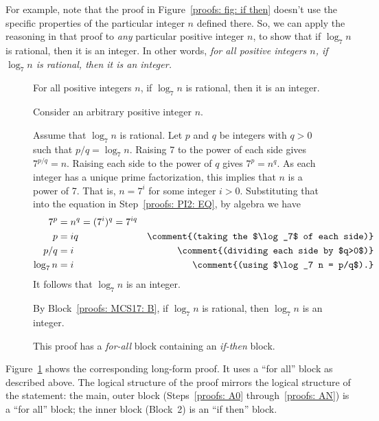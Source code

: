 For example, note that the proof in Figure~\ref{proofs: fig: if then} doesn't use the specific properties
of the particular integer $n$ defined there.
So, we can apply the reasoning in that proof to \emph{any} particular positive integer $n$,
to show that if $\log_7 n$ is rational, then it is an integer.
In other words,
\emph{for all positive integers $n$, if $\log_7 n$ is rational, then it is an integer.}
\begin{figure}
\begin{framed}
  \begin{theorem}
    For all positive integers $n$, if $\log_7 n$ is rational, then it is an integer.
  \end{theorem}
  \begin{longFormProof}
    \step[proofs: A0] Consider an arbitrary positive integer $n$.
    \begin{block}\label{proofs: MCS17: B}
      \step Assume that $\log_7 n$ is rational.
      \step Let $p$ and $q$ be integers with $q>0$ such that $p/q = \log_7 n$.
      \step Raising 7 to the power of each side gives $7^{p/q} {} = n$.  
      \step Raising each side to the power of $q$ gives $7^p {} = n^q$.\label{proofs: PI2: EQ}
      \step As each integer has a unique prime factorization, this implies that $n$ is a power of 7.
      \comment{\smash{$\vdots$}~~~}
      \step That is, $n=7^i$ for some integer $i > 0$.
      \step Substituting that into the equation in Step~\ref{proofs: PI2: EQ}, by algebra we have
      \begin{align*}
        7^p & = n^q = (7^i)^q = 7^{iq} \\
        p & = iq & \comment{(taking the $\log_7$ of each side)} \\
        p/q & = i & \comment{(dividing each side by $q>0$)} \\
        \log_7 n & = i & \comment{(using $\log_7 n = p/q$).}
      \end{align*}
      \step It follows that $\log_7 n$ is an integer.
    \end{block}
    \step[proofs: AN] By Block~\ref{proofs: MCS17: B}, if $\log_7 n$ is rational, then $\log_7 n$ is an integer.
  \end{longFormProof}
  \vspace*{-10pt}
\end{framed}
\vspace*{-10pt}
\caption{This proof has a \emph{for-all} block containing an \emph{if-then} block.}\label{proofs: fig: for all}
\end{figure}
Figure~\ref{proofs: fig: for all} shows the corresponding long-form proof.
It uses a ``for all'' block as described above.
The logical structure of the proof
mirrors the logical structure of the statement:
the main, outer block (Steps~\ref{proofs: A0} through~\ref{proofs: AN}) is a ``for all'' block;
the inner block (Block~2) is an ``if then'' block.

